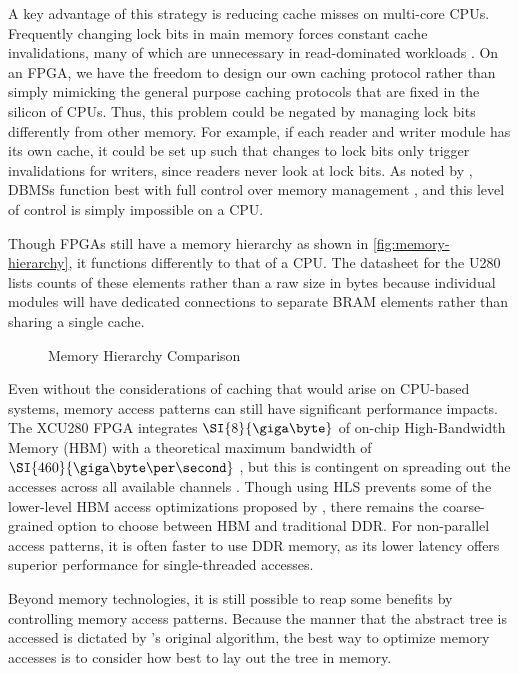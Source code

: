 A key advantage of this strategy is reducing cache misses on multi-core CPUs.
Frequently changing lock bits in main memory forces constant cache
invalidations, many of which are unnecessary in read-dominated workloads
\autocite{leis-damon-2016}. On an FPGA, we have the freedom to design our own
caching protocol rather than simply mimicking the general purpose caching
protocols that are fixed in the silicon of CPUs. Thus, this problem could be
negated by managing lock bits differently from other memory.
%
For example, if each reader and writer module has its own cache, it could be set
up such that changes to lock bits only trigger invalidations for writers, since
readers never look at lock bits. As noted by \citeauthor{binnig-vldb-2016},
DBMSs function best with full control over memory management
\autocite{binnig-vldb-2016}, and this level of control is simply impossible on a
CPU.


\label{subsec:memory-layout}

Though FPGAs still have a memory hierarchy as shown in
\autoref{fig:memory-hierarchy}, it functions differently to that of a CPU. The
datasheet for the U280 lists counts of these elements rather than a raw size in
bytes because individual modules will have dedicated connections to separate BRAM
elements rather than sharing a single cache.

\begin{figure}[H]
	\centering
	
	\caption{Memory Hierarchy Comparison}
	\label{fig:memory-hierarchy}
\end{figure}

Even without the considerations of caching that would arise on CPU-based
systems, memory access patterns can still have significant performance impacts.
The XCU280 FPGA integrates $\SI{8}{\giga\byte}$ of on-chip High-Bandwidth Memory
(HBM) with a theoretical maximum bandwidth of $\SI{460}{\giga\byte\per\second}$
\autocite{u280}, but this is contingent on spreading out the accesses across all
available channels \autocite{holzinger-ipdpsw-2021}.
% 
Though using HLS prevents some of the lower-level HBM access optimizations
proposed by \citeauthor{holzinger-ipdpsw-2021} \autocite{holzinger-ipdpsw-2021},
there remains the coarse-grained option to choose between HBM and traditional
DDR. For non-parallel access patterns, it is often faster to use DDR memory, as
its lower latency offers superior performance for single-threaded accesses.

Beyond memory technologies, it is still possible to reap some benefits by
controlling memory access patterns. Because the manner that the abstract tree is
accessed is dictated by \citeauthor{b-link}'s original algorithm, the best way
to optimize memory accesses is to consider how best to lay out the tree in
memory.

